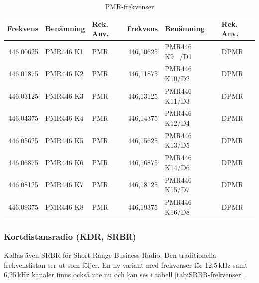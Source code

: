 \begin{table}[H]
\centering
\begin{tabular}{rll|rll}
	\textbf{Frekvens} & \textbf{Benämning} & \textbf{Rek. Anv.}& 
	\textbf{Frekvens} & \textbf{Benämning} & \textbf{Rek. Anv.}      \\ \hline
	446,00625 & PMR446 K1          & PMR                                   &          446,10625 & PMR446 K9\ \,\,/D1       & DPMR \\
	446,01875 & PMR446 K2          & PMR                                   &          446,11875 & PMR446 K10/D2      & DPMR \\
	446,03125 & PMR446 K3          & PMR                                   &          446,13125 & PMR446 K11/D3      & DPMR \\
	446,04375 & PMR446 K4          & PMR                                   &          446,14375 & PMR446 K12/D4      & DPMR \\
	446,05625 & PMR446 K5          & PMR                                   &          446,15625 & PMR446 K13/D5      & DPMR \\
	446,06875 & PMR446 K6          & PMR                                   &          446,16875 & PMR446 K14/D6      & DPMR \\
	446,08125 & PMR446 K7          & PMR                                   &          446,18125 & PMR446 K15/D7      & DPMR \\
	446,09375 & PMR446 K8          & PMR                                   &          446,19375 & PMR446 K16/D8      & DPMR
\end{tabular}
\caption{PMR-frekvenser}
\label{tab:pmr-frekvenser}
\end{table}

\subsubsection{Kortdistansradio (KDR, SRBR)}

Kallas även SRBR för Short Range Business Radio. 
Den traditionella frekvenslistan ser ut som följer. En ny variant med frekvenser för 12,5\,kHz samt 6,25\,kHz kanaler finns också ute nu och kan ses i tabell \ref{tab:SRBR-frekvenser}.

